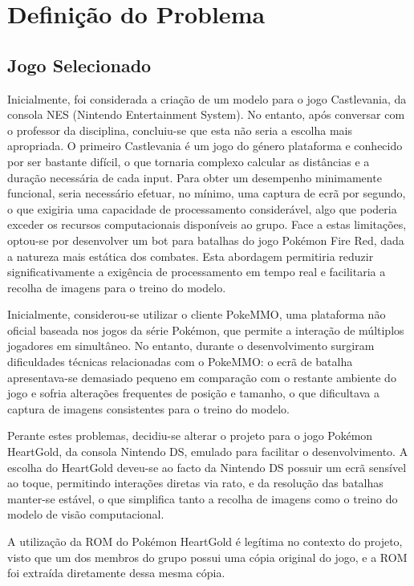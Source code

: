 \section{Definição do Problema} \label{definicao_problema}
\subsection{Jogo Selecionado}
Inicialmente, foi considerada a criação de um modelo para o jogo Castlevania, da consola NES (Nintendo Entertainment System). No entanto, após conversar com o professor da disciplina, concluiu-se que esta não seria a escolha mais apropriada. O primeiro Castlevania é um jogo do género plataforma e conhecido por ser bastante difícil, o que tornaria complexo calcular as distâncias e a duração necessária de cada input. Para obter um desempenho minimamente funcional, seria necessário efetuar, no mínimo, uma captura de ecrã por segundo, o que exigiria uma capacidade de processamento considerável, algo que poderia exceder os recursos computacionais disponíveis ao grupo. Face a estas limitações, optou-se por desenvolver um bot para batalhas do jogo Pokémon Fire Red, dada a natureza mais estática dos combates. Esta abordagem permitiria reduzir significativamente a exigência de processamento em tempo real e facilitaria a recolha de imagens para o treino do modelo.

Inicialmente, considerou-se utilizar o cliente PokeMMO, uma plataforma não oficial baseada nos jogos da série Pokémon, que permite a interação de múltiplos jogadores em simultâneo. No entanto, durante o desenvolvimento surgiram dificuldades técnicas relacionadas com o PokeMMO: o ecrã de batalha apresentava-se demasiado pequeno em comparação com o restante ambiente do jogo e sofria alterações frequentes de posição e tamanho, o que dificultava a captura de imagens consistentes para o treino do modelo.

Perante estes problemas, decidiu-se alterar o projeto para o jogo Pokémon HeartGold, da consola Nintendo DS, emulado para facilitar o desenvolvimento. A escolha do HeartGold deveu-se ao facto da Nintendo DS possuir um ecrã sensível ao toque, permitindo interações diretas via rato, e da resolução das batalhas manter-se estável, o que simplifica tanto a recolha de imagens como o treino do modelo de visão computacional.

A utilização da ROM do Pokémon HeartGold é legítima no contexto do projeto, visto que um dos membros do grupo possui uma cópia original do jogo, e a ROM foi extraída diretamente dessa mesma cópia.

